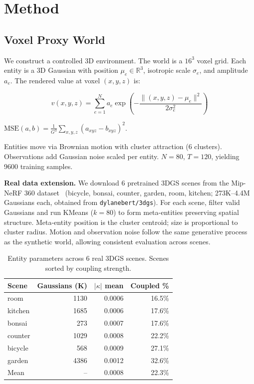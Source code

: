 \documentclass[10pt,twocolumn]{article}
\begin{document}
\section{Method}

\subsection{Voxel Proxy World}

We construct a controlled 3D environment. The world is a $16^3$ voxel grid. Each entity is a 3D Gaussian with position $\mu_e \in \mathbb{R}^3$, isotropic scale $\sigma_e$, and amplitude $a_e$. The rendered value at voxel $(x,y,z)$ is:

\begin{equation}
v(x,y,z) = \sum_{e=1}^N a_e \exp\left(-\frac{\|(x,y,z) - \mu_e\|^2}{2\sigma_e^2}\right)
\end{equation}

$\text{MSE}(a,b) = \frac{1}{G^3} \sum_{x,y,z} (a_{xyz} - b_{xyz})^2$.

Entities move via Brownian motion with cluster attraction (6 clusters). Observations add Gaussian noise scaled per entity. $N=80$, $T=120$, yielding 9600 training samples.

\textbf{Real data extension.} We download 6 pretrained 3DGS scenes from the Mip-NeRF 360 dataset~\cite{mipnerf360} (bicycle, bonsai, counter, garden, room, kitchen; 273K--4.4M Gaussians each, obtained from \texttt{dylanebert/3dgs}). For each scene, filter valid Gaussians and run KMeans ($k=80$) to form meta-entities preserving spatial structure. Meta-entity position is the cluster centroid; size is proportional to cluster radius. Motion and observation noise follow the same generative process as the synthetic world, allowing consistent evaluation across scenes.

\begin{table}[t]
\centering
\caption{Entity parameters across 6 real 3DGS scenes. Scenes sorted by coupling strength.}
\label{tab:params}
\begin{tabular}{lrrr}
\toprule
Scene & Gaussians (K) & $|\kappa|$ mean & Coupled \% \\
\midrule
room & 1130 & 0.0006 & 16.5\% \\
kitchen & 1685 & 0.0006 & 17.6\% \\
bonsai & 273 & 0.0007 & 17.6\% \\
counter & 1029 & 0.0008 & 22.2\% \\
bicycle & 568 & 0.0009 & 27.1\% \\
garden & 4386 & 0.0012 & 32.6\% \\
\midrule
Mean & -- & 0.0008 & 22.3\% \\
\bottomrule
\end{tabular}
\end{table}
\end{document}
